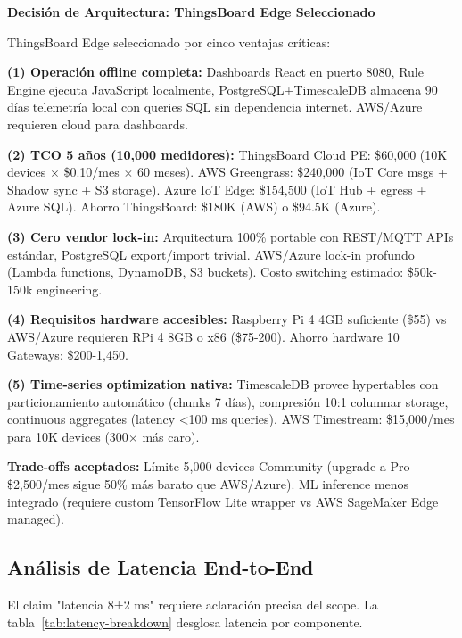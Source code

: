 \textbf{Decisión de Arquitectura: ThingsBoard Edge Seleccionado}

ThingsBoard Edge seleccionado por cinco ventajas críticas:

\textbf{(1) Operación offline completa:} Dashboards React en puerto 8080, Rule Engine ejecuta JavaScript localmente, PostgreSQL+TimescaleDB almacena 90 días telemetría local con queries SQL sin dependencia internet. AWS/Azure requieren cloud para dashboards.

\textbf{(2) TCO 5 años (10,000 medidores):} ThingsBoard Cloud PE: \$60,000 (10K devices $\times$ \$0.10/mes $\times$ 60 meses). AWS Greengrass: \$240,000 (IoT Core msgs + Shadow sync + S3 storage). Azure IoT Edge: \$154,500 (IoT Hub + egress + Azure SQL). Ahorro ThingsBoard: \$180K (AWS) o \$94.5K (Azure).

\textbf{(3) Cero vendor lock-in:} Arquitectura 100\% portable con REST/MQTT APIs estándar, PostgreSQL export/import trivial. AWS/Azure lock-in profundo (Lambda functions, DynamoDB, S3 buckets). Costo switching estimado: \$50k-150k engineering.

\textbf{(4) Requisitos hardware accesibles:} Raspberry Pi 4 4GB suficiente (\$55) vs AWS/Azure requieren RPi 4 8GB o x86 (\$75-200). Ahorro hardware 10 Gateways: \$200-1,450.

\textbf{(5) Time-series optimization nativa:} TimescaleDB provee hypertables con particionamiento automático (chunks 7 días), compresión 10:1 columnar storage, continuous aggregates (latency <100 ms queries). AWS Timestream: \$15,000/mes para 10K devices (300$\times$ más caro).

\textbf{Trade-offs aceptados:} Límite 5,000 devices Community (upgrade a Pro \$2,500/mes sigue 50\% más barato que AWS/Azure). ML inference menos integrado (requiere custom TensorFlow Lite wrapper vs AWS SageMaker Edge managed).

\subsection{Análisis de Latencia End-to-End}

El claim "latencia 8±2 ms" requiere aclaración precisa del scope. La tabla~\ref{tab:latency-breakdown} desglosa latencia por componente.

